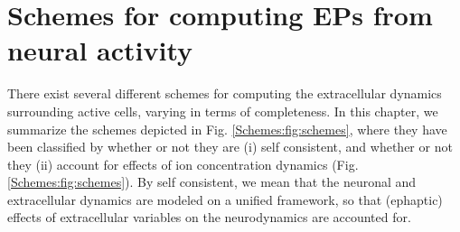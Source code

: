 \section{Schemes for computing EPs from neural activity}
\label{sec:Schemes}

There exist several different schemes for computing the extracellular dynamics surrounding active cells, varying in terms of completeness. In this chapter, we summarize the schemes depicted in Fig. \ref{Schemes:fig:schemes}, where they have been classified by whether or not they are (i) self consistent, and whether or not they (ii) account for effects of ion concentration dynamics (Fig. \ref{Schemes:fig:schemes}). By self consistent, we mean that the neuronal and extracellular dynamics are modeled on a unified framework, so that (ephaptic) effects of extracellular variables on the neurodynamics are accounted for. 


